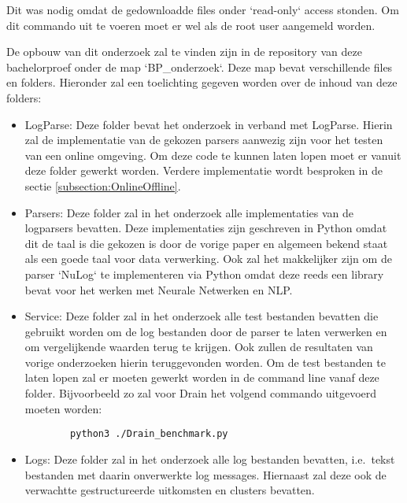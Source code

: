 Dit was nodig omdat de gedownloadde files onder `read-only` access stonden. Om dit commando uit te voeren moet er wel als de root user aangemeld worden.


De opbouw van dit onderzoek zal te vinden zijn in de repository van deze bachelorproef onder de map `BP\_onderzoek`. Deze map bevat verschillende files en folders. Hieronder zal een toelichting gegeven worden over de inhoud van deze folders:
\begin{itemize}
    \item LogParse: Deze folder bevat het onderzoek in verband met LogParse. Hierin zal de implementatie van de gekozen parsers aanwezig zijn voor het testen van een online omgeving. Om deze code te kunnen laten lopen moet er vanuit deze folder gewerkt worden. Verdere implementatie wordt besproken in de sectie \ref{subsection:OnlineOffline}.\\
    
    \item Parsers: Deze folder zal in het onderzoek alle implementaties van de logparsers bevatten. Deze implementaties zijn geschreven in Python omdat dit de taal is die gekozen is door de vorige paper en algemeen bekend staat als een goede taal voor data verwerking. Ook zal het makkelijker zijn om de parser `NuLog` te implementeren via Python omdat deze reeds een library bevat voor het werken met Neurale Netwerken en NLP.\\
    
    \item Service: Deze folder zal in het onderzoek alle test bestanden bevatten die gebruikt worden om de log bestanden door de parser te laten verwerken en om vergelijkende waarden terug te krijgen. Ook zullen de resultaten van vorige onderzoeken hierin teruggevonden worden. Om de test bestanden te laten lopen zal er moeten gewerkt worden in de command line vanaf deze folder. Bijvoorbeeld zo zal voor Drain het volgend commando uitgevoerd moeten worden:
    
    \begin{verbatim}
        python3 ./Drain_benchmark.py
    \end{verbatim}

    \item Logs: Deze folder zal in het onderzoek alle log bestanden bevatten, i.e.\ tekst bestanden met daarin onverwerkte log messages. Hiernaast zal deze ook de verwachtte gestructureerde uitkomsten en clusters bevatten.
\end{itemize}

